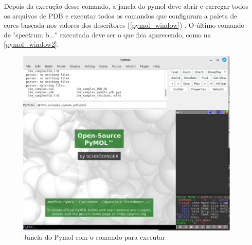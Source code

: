 \documentclass[a4paper,11pt]{refart}
\begin{document}
	Depois da execução desse comando, a janela do pymol deve abrir e carregar todos os arquivos de PDB e executar todos os comandos que configuram a paleta de cores baseada nos valores dos descritores (\autoref{pymol_window}) . O último comando de "spectrum b..." executada deve ser o que fica aparecendo, como na \autoref{pymol_window2}.

	\hspace*{-\leftmarginwidth}
	\begin{minipage}{\fullwidth}
		\begin{figure}[H]
			\begin{center}
				\includegraphics[width=5in]{pymol_window}
				\caption{Janela do Pymol com o comando para executar}
				\label{pymol_window}
			\end{center}
		\end{figure}
	\end{minipage}
\end{document}

